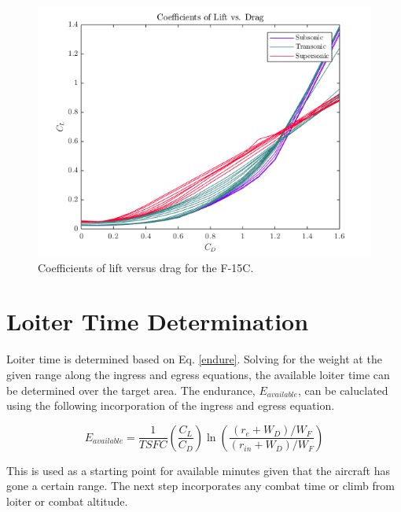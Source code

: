 \begin{figure}[H]
    \centering
    \includegraphics{Thesis/Method/MachSpeedByGroup.png}%
    \caption{Coefficients of lift versus drag for the F-15C.}%
    \label{fig:machSpeedByGroup}%
\end{figure}
\section{Loiter Time Determination}
Loiter time is determined based on Eq. \ref{endure}. Solving for the weight at the given range along the ingress and egress equations, the available loiter time can be determined over the target area. The endurance, $E_{available}$, can be caluclated using the following incorporation of the ingress and egress equation.

\begin{equation}
    E_{available} = \dfrac{1}{TSFC}\left(\dfrac{C_L}{C_D}\right)\ln\left(\dfrac{(r_e+ W_D)/W_F}{(r_{in}+W_D)/W_F}\right)
\end{equation}

This is used as a starting point for available minutes given that the aircraft has gone a certain range. The next step incorporates any combat time or climb from loiter or combat altitude. 

